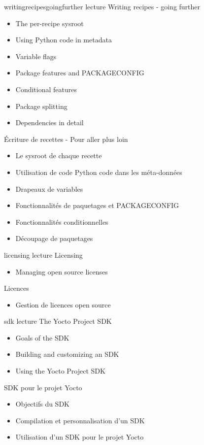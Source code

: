 {writingrecipesgoingfurther}
{lecture}
{Writing recipes - going further}
{
  \begin{itemize}
  \item The per-recipe sysroot
  \item Using Python code in metadata
  \item Variable flags
  \item Package features and PACKAGECONFIG
  \item Conditional features
  \item Package splitting
  \item Dependencies in detail
  \end{itemize}
}
{Écriture de recettes - Pour aller plus loin}
{
  \begin{itemize}
  \item Le sysroot de chaque recette
  \item Utilisation de code Python code dans les méta-données
  \item Drapeaux de variables
  \item Fonctionnalités de paquetages et PACKAGECONFIG
  \item Fonctionnalités conditionnelles
  \item Découpage de paquetages
  \end{itemize}
}

{licensing}
{lecture}
{Licensing}
{
  \begin{itemize}
  \item Managing open source licenses
  \end{itemize}
}
{Licences}
{
  \begin{itemize}
  \item Gestion de licences open source
  \end{itemize}
}

{sdk}
{lecture}
{The Yocto Project SDK}
{
  \begin{itemize}
  \item Goals of the SDK
  \item Building and customizing an SDK
  \item Using the Yocto Project SDK
  \end{itemize}
}
{SDK pour le projet Yocto}
{
  \begin{itemize}
  \item Objectifs du SDK
  \item Compilation et personnalisation d'un SDK
  \item Utilisation d'un SDK pour le projet Yocto
  \end{itemize}
}

